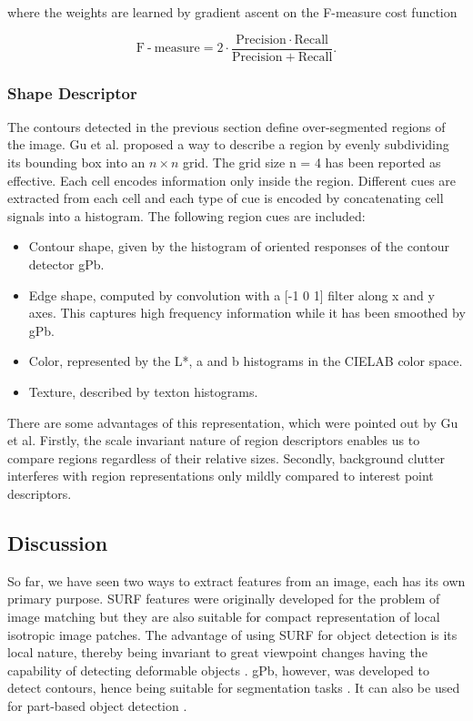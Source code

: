 \documentclass{SMBV13}
\begin{document}
where the weights are learned by gradient ascent on the F-measure cost function

\begin{equation}
\mathrm{F} \operatorname{-} \mathrm{measure} = 2\cdot \dfrac{\mathrm{Precision} \cdot \mathrm{Recall}}{\mathrm{Precision + Recall}}.
\end{equation} 


\subsubsection{Shape Descriptor}
\label{sec:shape_descriptor}

The contours detected in the previous section define over-segmented regions of the image. Gu et al. \cite{gu2009recognition} proposed a way to describe a region by evenly subdividing its bounding box into an $n \times n$ grid. The grid size n = 4 has been reported as effective. Each cell encodes information only inside the region. Different cues are extracted from each cell and each type of cue is encoded by concatenating cell signals into a histogram. The following region cues are included:

\begin{itemize}
\item Contour shape, given by the histogram of oriented responses of the contour detector gPb.
\item Edge shape, computed by convolution with a [-1 0 1] filter along x and y axes. This captures high frequency information while it has been smoothed by gPb.
\item Color, represented by the L*, a and b histograms in the CIELAB color space.
\item Texture, described by texton histograms.
\end{itemize}

There are some advantages of this representation, which were pointed out by Gu et al. Firstly, the scale invariant nature of region descriptors enables us to compare regions regardless of their relative sizes. Secondly, background clutter interferes with region representations only mildly compared to interest point descriptors.


\subsection{Discussion}

So far, we have seen two ways to extract features from an image, each has its own primary purpose. SURF features were originally developed for the problem of image matching but they are also suitable for compact representation of local isotropic image patches. The advantage of using SURF for object detection is its local nature, thereby being invariant to great viewpoint changes having the capability of detecting deformable objects \cite{VijayGrauman2011}. gPb, however, was developed to detect contours, hence being suitable for segmentation tasks \cite{arbelaez2009contours} \cite{gu2009recognition}. It can also be used for part-based object detection \cite{VijayGrauman2011} \cite{gu2009recognition}.
\end{document}
